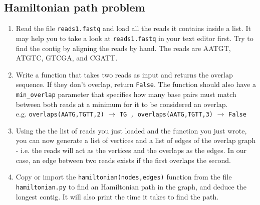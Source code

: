 \documentclass[a4paper,11pt]{article}
\begin{document}
\subsection{Hamiltonian path problem}
\begin{enumerate}
\item Read the file \texttt{reads1.fastq} and load all the reads it contains inside a list. It may help you to take a look at \texttt{reads1.fastq} in your text editor first. Try to find the contig by aligning the reads by hand. The reads are AATGT, ATGTC, GTCGA, and CGATT.
\item Write a function that takes two reads as input and returns the overlap sequence. If they don't overlap, return \texttt{False}. The function should also have a \texttt{min\_overlap} parameter that specifies how many base pairs must match between both reads at a minimum for it to be considered an overlap. \\
e.g. \texttt{overlaps(AATG,TGTT,2)} $\rightarrow$ \texttt{TG , overlaps(AATG,TGTT,3)} $\rightarrow$ \texttt{False}
\item Using the the list of reads you just loaded and the function you just wrote, you can now generate a list of vertices and a list of edges of the overlap graph - i.e. the reads will act as the vertices and the overlaps as the edges. In our case, an edge between two reads exists if the first overlaps the second.
\item Copy or import the \texttt{hamiltonian(nodes,edges)} function from the file \texttt{hamiltonian.py} to find an Hamiltonian path in the graph, and deduce the longest contig. It will also print the time it takes to find the path.
\end{enumerate}
\end{document}
